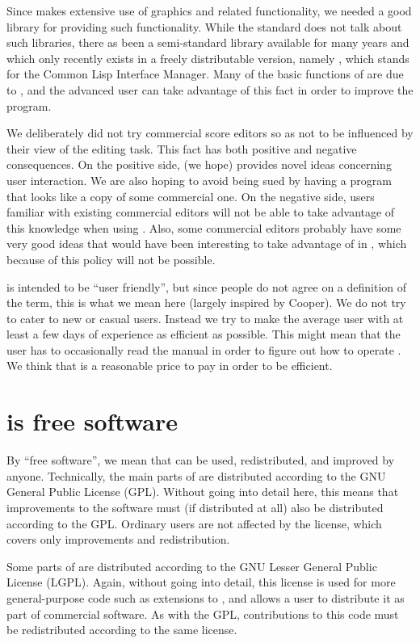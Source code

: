 Since {\gs} makes extensive use of graphics and related functionality,
we needed a good library for providing such functionality.  While the
{\commonlisp} standard does not talk about such libraries, there as been a
semi-standard library available for many years and which only recently
exists in a freely distributable version, namely {\clim}\index{\clim},
which stands for the Common Lisp Interface Manager.  Many of the basic
functions of {\gs} are due to {\clim}, and the advanced {\gs} user can
take advantage of this fact in order to improve the program. 

We deliberately did not try commercial score editors so as not to be
influenced by their view of the editing task.  This fact has both
positive and negative consequences.  On the positive side, {\gs} (we
hope) provides novel ideas concerning user interaction.  We are also
hoping to avoid being sued by having a program that looks like a copy
of some commercial one.  On the negative side, users familiar with
existing commercial editors will not be able to take advantage of this
knowledge when using {\gs}.  Also, some commercial editors probably
have some very good ideas that would have been interesting to take
advantage of in {\gs}, which because of this policy will not be
possible. 

{\gs} is intended to be ``user friendly'', but since people do not
agree on a definition of the term, this is what we mean here (largely
inspired by Cooper).  We do not try to cater to new or casual users.
Instead we try to make the average user with at least a few days of
experience as efficient as possible.  This might mean that the user
has to occasionally read the manual in order to figure out how to
operate {\gs}.  We think that is a reasonable price to pay in order to
be efficient. 
\section{{\gs} is free software}

By ``free software'', we mean that {\gs} can be used, redistributed,
and improved by anyone.  Technically, the main parts of {\gs} are
distributed according to the GNU General Public License (GPL).
Without going into detail here, this means that improvements to the
software must (if distributed at all) also be distributed according to
the GPL.  Ordinary users are not affected by the license, which covers
only improvements and redistribution.  

Some parts of {\gs} are distributed according to the GNU Lesser
General Public License (LGPL).  Again, without going into detail, this
license is used for more general-purpose code such as extensions to
{\clim}, and allows a user to distribute it as part of commercial
software.  As with the GPL, contributions to this code must be
redistributed according to the same license. 

